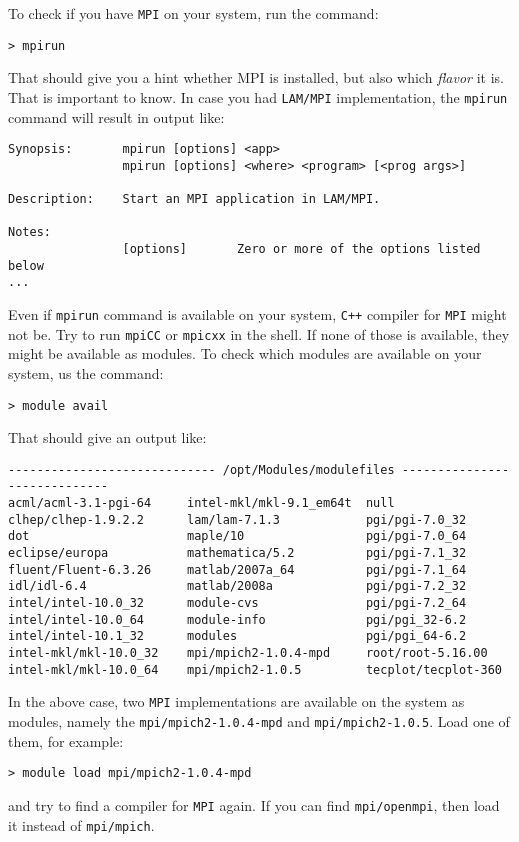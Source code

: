 To check if you have {\tt MPI} on your system, run the command:
%
\begin{verbatim}
> mpirun
\end{verbatim}
%
That should give you a hint whether MPI is installed, but also which {\em flavor}
it is. That is important to know. In case you had {\tt LAM/MPI} implementation,
the {\tt mpirun} command will result in output like:
%
{\small \begin{verbatim}
Synopsis:       mpirun [options] <app>
                mpirun [options] <where> <program> [<prog args>]

Description:    Start an MPI application in LAM/MPI.

Notes:
                [options]       Zero or more of the options listed below
...
\end{verbatim}}
%
Even if {\tt mpirun} command is available on your system, {\tt C++} compiler
for {\tt MPI} might not be. Try to run {\tt mpiCC} or {\tt mpicxx} in the shell.
%
If none of those is available, they might be available as modules. To check 
which modules are available on your system, us the command:
%
\begin{verbatim}
> module avail
\end{verbatim}
%
That should give an output like:
%
{\small \begin{verbatim}
----------------------------- /opt/Modules/modulefiles -----------------------------
acml/acml-3.1-pgi-64     intel-mkl/mkl-9.1_em64t  null
clhep/clhep-1.9.2.2      lam/lam-7.1.3            pgi/pgi-7.0_32
dot                      maple/10                 pgi/pgi-7.0_64
eclipse/europa           mathematica/5.2          pgi/pgi-7.1_32
fluent/Fluent-6.3.26     matlab/2007a_64          pgi/pgi-7.1_64
idl/idl-6.4              matlab/2008a             pgi/pgi-7.2_32
intel/intel-10.0_32      module-cvs               pgi/pgi-7.2_64
intel/intel-10.0_64      module-info              pgi/pgi_32-6.2
intel/intel-10.1_32      modules                  pgi/pgi_64-6.2
intel-mkl/mkl-10.0_32    mpi/mpich2-1.0.4-mpd     root/root-5.16.00
intel-mkl/mkl-10.0_64    mpi/mpich2-1.0.5         tecplot/tecplot-360
\end{verbatim}}
%
In the above case, two {\tt MPI} implementations are available on the system as modules,
namely the {\tt mpi/mpich2-1.0.4-mpd} and {\tt mpi/mpich2-1.0.5}. Load one of them,
for example:
%
\begin{verbatim}
> module load mpi/mpich2-1.0.4-mpd
\end{verbatim}
%
and try to find a compiler for {\tt MPI} again. If you can find {\tt mpi/openmpi}, then load it instead of {\tt mpi/mpich}.

